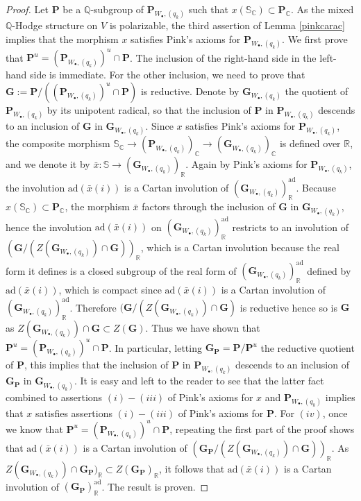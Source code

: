 \documentclass[10pt]{article}
\numberwithin{equation}{subsection}
\theoremstyle{plain}
\theoremstyle{definition}
\theoremstyle{remark}
\newcommand{\Q}{\mathbb Q}
\newcommand{\C}{\mathbb C}
\newcommand{\R}{\mathbb R}
\newcommand{\s}{\mathbb S}
\newcommand{\G}{\mathbf G}
\newcommand{\pp}{\mathbf P}
\newcommand{\bul}{\bullet}
\newcommand{\ad}{\mathrm{ad}}
\newcommand{\ppol}{\pp_{W_\bul, (q_k)}}
\newcommand{\gpol}{\G_{W_\bul, (q_k)}}
\begin{document}
\begin{proof}
Let $\pp$ be a $\Q$-subgroup of $\ppol$ such that $x(\s_\C) \subset \pp_\C$. As the mixed $\Q$-Hodge structure on $V$ is polarizable, the third assertion of Lemma \ref{pinkcarac} implies that the morphism $x$ satisfies Pink's axioms for $\ppol$. We first prove that $\pp^u = (\ppol)^u \cap \pp$. The inclusion of the right-hand side in the left-hand side is immediate. For the other inclusion, we need to prove that $\G := \pp/((\ppol)^u \cap \pp)$ is reductive. Denote by $\gpol$ the quotient of $\ppol$ by its unipotent radical, so that the inclusion of $\pp$ in $\ppol$ descends to an inclusion of $\G$ in $\gpol$. Since $x$ satisfies Pink's axioms for $\ppol$, the composite morphism $\s_\C \rightarrow (\ppol)_\C \rightarrow (\gpol)_\C$ is defined over $\R$, and we denote it by $\bar{x} : \s \rightarrow (\gpol)_\R$. Again by Pink's axioms for $\ppol$, the involution $\ad(\bar{x}(i))$ is a Cartan involution of $(\gpol)_\R^\ad$. Because $x(\s_\C) \subset \pp_\C$, the morphism $\bar{x}$ factors through the inclusion of $\G$ in $\gpol$, hence the involution $\ad(\bar{x}(i))$ on $(\gpol)_\R^\ad$ restricts to an involution of $(\G/(Z(\gpol) \cap \G))_\R$, which is a Cartan involution because the real form it defines is a closed subgroup of the real form of $(\gpol)_\R^\ad$ defined by $\ad(\bar{x}(i))$, which is compact since $\ad(\bar{x}(i))$ is a Cartan involution of $(\gpol)_\R^\ad$. Therefore $(\G/(Z(\gpol) \cap \G)$ is reductive hence so is $\G$ as $Z(\gpol) \cap \G \subset Z(\G)$. Thus we have shown that $\pp^u = (\ppol)^u \cap \pp$. In particular, letting $\G_\pp = \pp/\pp^u$ the reductive quotient of $\pp$, this implies that the inclusion of $\pp$ in $\ppol$ descends to an inclusion of $\G_\pp$ in $\gpol$. It is easy and left to the reader to see that the latter fact combined to assertions $(i)-(iii)$ of Pink's axioms for $x$ and $\ppol$ implies that $x$ satisfies assertions $(i)-(iii)$ of Pink's axioms for $\pp$. For $(iv)$, once we know that $\pp^u = (\ppol)^u \cap \pp$, repeating the first part of the proof shows that $\ad(\bar{x}(i))$ is a Cartan involution of $(\G_\pp/(Z(\gpol) \cap \G))_\R$. As $Z(\gpol) \cap \G_\pp)_\R \subset Z(\G_\pp)_\R$, it follows that $\ad(\bar{x}(i))$ is a Cartan involution of $(\G_\pp)^\ad_\R$. The result is proven.


\end{proof}
\end{document}
